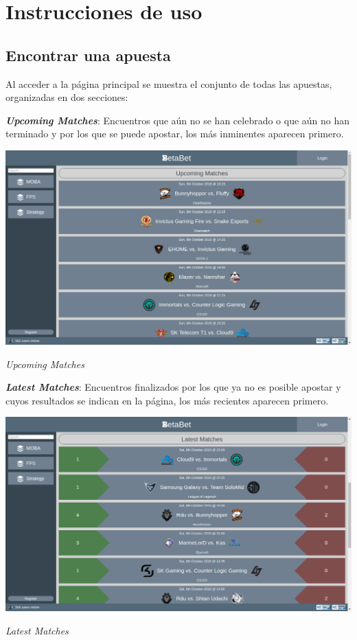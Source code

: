 \documentclass{article}
\begin{document}
\section{Instrucciones de uso}
\subsection{Encontrar una apuesta}
Al acceder a la página principal se muestra el conjunto de todas las apuestas, organizadas en dos secciones:
\begin{multicols}{2}
    \textbf{\textit{Upcoming Matches}}: Encuentros que aún no se han celebrado o que aún no han terminado y por los que se puede apostar, los más inminentes aparecen primero.
    \begin{minipage}{\linewidth}
        \centering
        \captionsetup{type=figure}
        \includegraphics[width=\linewidth]{fig1}
        \caption{\textit{Upcoming Matches}}
        \label{fig:fig1}
    \end{minipage}
    \columnbreak\newline
    \textbf{\textit{Latest Matches}}: Encuentros finalizados por los que ya no es posible apostar y cuyos resultados se indican en la página, los más recientes aparecen primero.
    \begin{minipage}{\linewidth}
        \centering
        \captionsetup{type=figure}
        \includegraphics[width=\linewidth]{fig2}
        \caption{\textit{Latest Matches}}
        \label{fig:fig2}
    \end{minipage}
\end{multicols}
\end{document}
